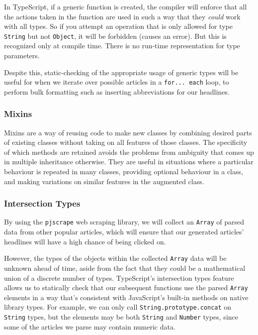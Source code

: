 \documentclass[]{article}
\begin{document}
In TypeScript, if a generic function is created, the compiler will
enforce that all the actions taken in the function are used in such a
way that they \emph{could} work with all types. So if you attempt an
operation that is only allowed for type \texttt{String} but not
\texttt{Object}, it will be forbidden (causes an
error).\cite{ref3} But this is recognized only at compile
time. There is no run-time representation for type
parameters.\cite{ref3bi}

Despite this, static-checking of the appropriate usage of generic types
will be useful for when we iterate over possible articles in a
\texttt{for... each} loop, to perform bulk formatting such as inserting
abbreviations for our headlines.

\subsubsection{Mixins}\label{mixins}

Mixins are a way of reusing code to make new classes by combining
desired parts of existing classes without taking on all features of
those classes. The specificity of which methods are retained avoids the
problems from ambiguity that comes up in multiple inheritance otherwise.
They are useful in situations where a particular behaviour is repeated
in many classes, providing optional behaviour in a class, and making
variations on similar features in the augmented class.
\cite{ref3}

\subsubsection{Intersection Types}\label{intersection-types}

By using the \texttt{pjscrape} web scraping library, we will collect an
\texttt{Array} of parsed data from other popular articles, which will
ensure that our generated articles' headlines will have a high chance of
being clicked on.

However, the types of the objects within the collected \texttt{Array}
data will be unknown ahead of time, aside from the fact that they could
be a mathematical union of a discrete number of types. TypeScript's
intersection types feature \cite{ref4} allows us to
statically check that our subsequent functions use the parsed
\texttt{Array} elements in a way that's consistent with JavaScript's
built-in methods on native library types. For example, we can only call
\texttt{String.prototype.concat} on \texttt{String} types, but the
elements may be both \texttt{String} and \texttt{Number} types, since
some of the articles we parse may contain numeric data.
\end{document}

